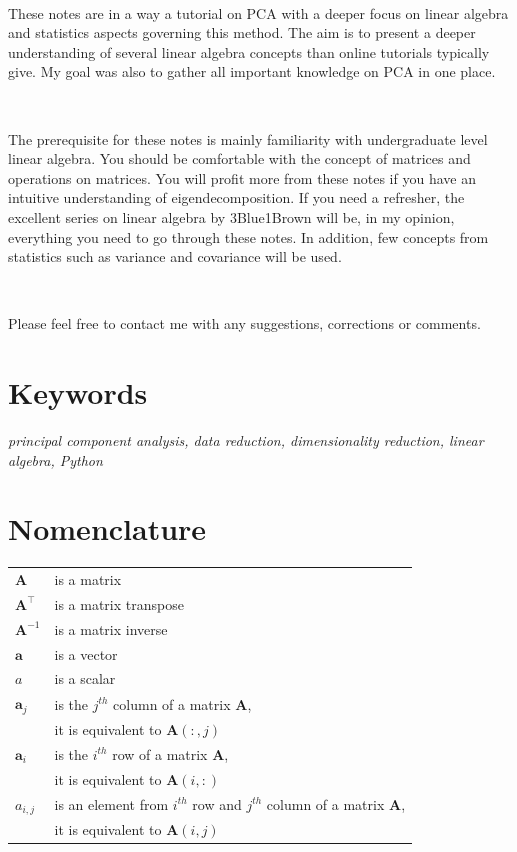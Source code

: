 \documentclass[10pt,twocolumn]{article}
\begin{document}
\,\,

These notes are in a way a tutorial on PCA with a deeper focus on linear algebra and statistics aspects governing this method. The aim is to present a deeper understanding of several linear algebra concepts than online tutorials typically give. My goal was also to gather all important knowledge on PCA in one place. 

\,\,

The prerequisite for these notes is mainly familiarity with undergraduate level linear algebra. You should be comfortable with the concept of matrices and operations on matrices. You will profit more from these notes if you have an intuitive understanding of eigendecomposition. If you need a refresher, the excellent series on linear algebra by 3Blue1Brown \cite{3Blue1Brown} will be, in my opinion, everything you need to go through these notes. In addition, few concepts from statistics such as variance and covariance will be used.

\,\,

Please feel free to contact me with any suggestions, corrections or comments.

\section*{Keywords}

\textit{principal component analysis, data reduction, dimensionality reduction, linear algebra, Python}

\tableofcontents

\section*{Nomenclature}

\begin{tabular}{ll}
    $\mathbf{A}$ & is a matrix \\
     $\mathbf{A}^{\top}$ & is a matrix transpose \\
     $\mathbf{A}^{-1}$ & is a matrix inverse \\
     $\mathbf{a}$ & is a vector \\
     $a$ & is a scalar \\
    $\mathbf{a}_j$ & is the $j^{th}$ column of a matrix $\mathbf{A}$, \\
    & it is equivalent to  $\mathbf{A}(:,j)$ \\
    $\mathbf{a}_i$ & is the $i^{th}$ row of a matrix $\mathbf{A}$, \\
    & it is equivalent to  $\mathbf{A}(i,:)$ \\
    $a_{i,j}$ & is an element from $i^{th}$ row and $j^{th}$ column of a matrix $\mathbf{A}$, \\ 
    & it is equivalent to  $\mathbf{A}(i,j)$ \\
\end{tabular}
\end{document}
